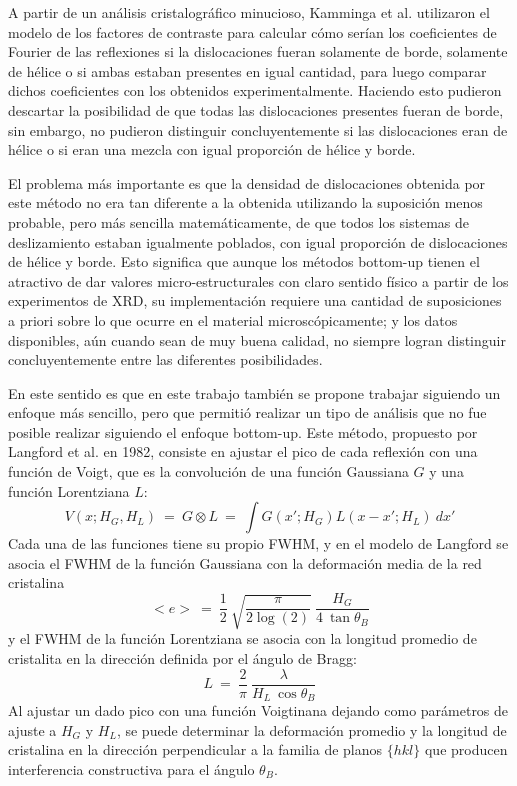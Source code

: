 A partir de un análisis cristalográfico minucioso, Kamminga et al. utilizaron el modelo de los factores de contraste para calcular cómo serían los coeficientes de Fourier de las reflexiones si la dislocaciones fueran solamente de borde, solamente de hélice o si ambas estaban presentes en igual cantidad, para luego comparar dichos coeficientes con los obtenidos experimentalmente.
Haciendo esto pudieron descartar la posibilidad de que todas las dislocaciones presentes fueran de borde, sin embargo, no pudieron distinguir concluyentemente si las dislocaciones eran de hélice o si eran una mezcla con igual proporción de hélice y borde.

El problema más importante es que la densidad de dislocaciones obtenida por este método no era tan diferente a la obtenida utilizando la suposición menos probable, pero más sencilla matemáticamente, de que todos los sistemas de deslizamiento estaban igualmente poblados, con igual proporción de dislocaciones de hélice y borde.
Esto significa que aunque los métodos bottom-up tienen el atractivo de dar valores micro-estructurales con claro sentido físico a partir de los experimentos de XRD, su implementación requiere una cantidad de suposiciones a priori sobre lo que ocurre en el material microscópicamente; y los datos disponibles, aún cuando sean de muy buena calidad, no siempre logran distinguir concluyentemente entre las diferentes posibilidades.

En este sentido es que en este trabajo también se propone trabajar siguiendo un enfoque más sencillo, pero que permitió realizar un tipo de análisis que no fue posible realizar siguiendo el enfoque bottom-up.
Este método, propuesto por Langford et al. en 1982\cite{DeKeijser1982}, consiste en ajustar el pico de cada reflexión con una función de Voigt, que es la convolución de una función Gaussiana $G$ y una función Lorentziana $L$:
\begin{equation}
  V(x; H_{G}, H_{L}) \ = \ G \otimes L \ = \ \int G(x'; H_{G}) L(x - x'; H_{L}) \ dx'
  \label{eq:Voigt}
\end{equation}
\noindent
Cada una de las funciones tiene su propio FWHM, y en el modelo de Langford se asocia el FWHM de la función Gaussiana con la deformación media de la red cristalina
\begin{equation}
  <e> \ = \ \frac{1}{2} \ \sqrt{\frac{\pi}{2\log(2)}} \ \frac{H_{G}}{4 \ \tan{\theta_B}}
  \label{eq:Gauss}
\end{equation}
\noindent
y el FWHM de la función Lorentziana se asocia con la longitud promedio de cristalita en la dirección definida por el ángulo de Bragg:
\begin{equation}
  L \ = \ \frac{2}{\pi} \ \frac{\lambda}{H_{L} \ \cos{\theta_B}}
  \label{eq:Lorentz}
\end{equation}
\noindent
Al ajustar un dado pico con una función Voigtinana dejando como parámetros de ajuste a $H_G$ y $H_L$, se puede determinar la deformación promedio y la longitud de  cristalina en la dirección perpendicular a la familia de planos $\{hkl\}$ que producen interferencia constructiva para el ángulo $\theta_B$.

